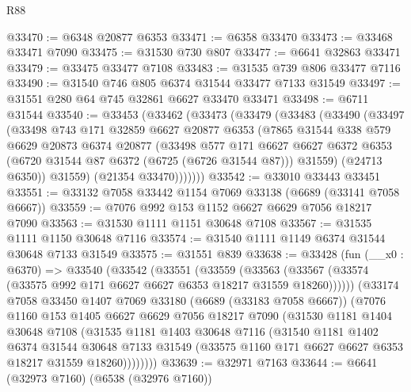 \begin{lexlean}{R88}
\begin{coremodule}
@33470 := @6348 @20877 @6353
@33471 := @6358 @33470
@33473 := @33468 @33471 @7090
@33475 := @31530 @730 @807
@33477 := @6641 @32863 @33471
@33479 := @33475 @33477 @7108
@33483 := @31535 @739 @806 @33477 @7116
@33490 := @31540 @746 @805 @6374 @31544 @33477 @7133 @31549
@33497 := @31551 @280 @64 @745 @32861 @6627 @33470 @33471
@33498 := @6711 @31544
@33540 := @33453
    (@33462
      (@33473
        (@33479
          (@33483
            (@33490
              (@33497
                (@33498
                  @743
                  @171
                  @32859
                  @6627
                  @20877
                  @6353
                  (@7865
                    @31544
                    @338
                    @579
                    @6629
                    @20873
                    @6374
                    @20877
                    (@33498
                      @577
                      @171
                      @6627
                      @6627
                      @6372
                      @6353
                      (@6720 @31544 @87 @6372 (@6725 (@6726 @31544 @87)))
                      @31559)
                    (@24713 @6350))
                  @31559)
                (@21354 @33470)))))))
@33542 := @33010 @33443 @33451
@33551 := @33132 @7058 @33442 @1154 @7069 @33138 (@6689 (@33141 @7058 @6667))
@33559 := @7076 @992 @153 @1152 @6627 @6629 @7056 @18217 @7090
@33563 := @31530 @1111 @1151 @30648 @7108
@33567 := @31535 @1111 @1150 @30648 @7116
@33574 := @31540 @1111 @1149 @6374 @31544 @30648 @7133 @31549
@33575 := @31551 @839
@33638 := @33428
    (fun (__x0 : @6370) =>
    @33540
      (@33542
        (@33551
          (@33559
            (@33563 (@33567 (@33574 (@33575 @992 @171 @6627 @6627 @6353 @18217 @31559 @18260))))))
        (@33174
          @7058
          @33450
          @1407
          @7069
          @33180
          (@6689 (@33183 @7058 @6667))
          (@7076
            @1160
            @153
            @1405
            @6627
            @6629
            @7056
            @18217
            @7090
            (@31530
              @1181
              @1404
              @30648
              @7108
              (@31535
                @1181
                @1403
                @30648
                @7116
                (@31540
                  @1181
                  @1402
                  @6374
                  @31544
                  @30648
                  @7133
                  @31549
                  (@33575 @1160 @171 @6627 @6627 @6353 @18217 @31559 @18260))))))))
@33639 := @32971 @7163
@33644 := @6641 (@32973 @7160) (@6538 (@32976 @7160))

\end{coremodule}
\end{lexlean}
